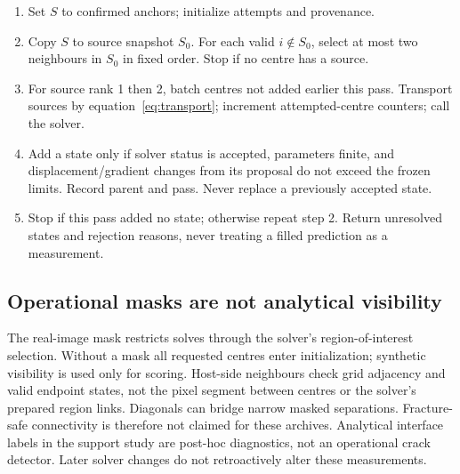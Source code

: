 \begin{table}[p]\small\centering
\caption{Snapshot frontier in the confirmatory workflow, corresponding to \texttt{seed\_propagation.propagate}. The historical median/three-attempt rule is separate.}\label{alg:frontier}
\begin{minipage}{.95\linewidth}\begin{enumerate}
\item Set $S$ to confirmed anchors; initialize attempts and provenance.
\item Copy $S$ to source snapshot $S_0$. For each valid $i\notin S_0$, select at most two neighbours in $S_0$ in fixed order. Stop if no centre has a source.
\item For source rank 1 then 2, batch centres not added earlier this pass. Transport sources by equation~\eqref{eq:transport}; increment attempted-centre counters; call the solver.
\item Add a state only if solver status is accepted, parameters finite, and displacement/gradient changes from its proposal do not exceed the frozen limits. Record parent and pass. Never replace a previously accepted state.
\item Stop if this pass added no state; otherwise repeat step 2. Return unresolved states and rejection reasons, never treating a filled prediction as a measurement.
\end{enumerate}\end{minipage}\end{table}

\subsection{Operational masks are not analytical visibility}
The real-image mask restricts solves through the solver's region-of-interest selection. Without a mask all requested centres enter initialization; synthetic visibility is used only for scoring. Host-side neighbours check grid adjacency and valid endpoint states, not the pixel segment between centres or the solver's prepared region links. Diagonals can bridge narrow masked separations. Fracture-safe connectivity is therefore not claimed for these archives. Analytical interface labels in the support study are post-hoc diagnostics, not an operational crack detector. Later solver changes do not retroactively alter these measurements.
